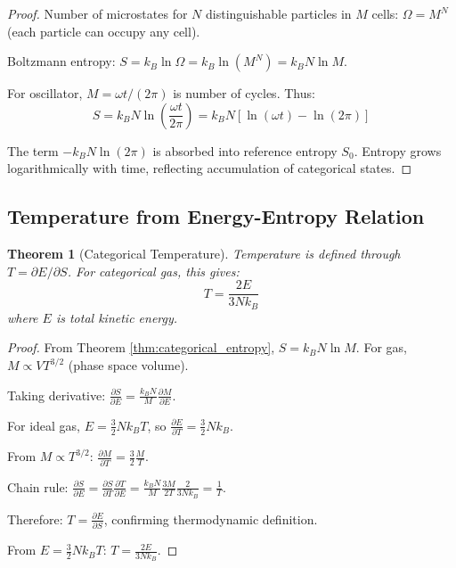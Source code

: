 \documentclass[twocolumn,10pt]{article}
\newtheorem{theorem}{Theorem}[section]
\begin{document}
\begin{proof}
Number of microstates for $N$ distinguishable particles in $M$ cells: $\Omega = M^N$ (each particle can occupy any cell).

Boltzmann entropy: $S = k_B \ln \Omega = k_B \ln(M^N) = k_B N \ln M$.

For oscillator, $M = \omega t/(2\pi)$ is number of cycles. Thus:
\begin{equation}
S = k_B N \ln\left(\frac{\omega t}{2\pi}\right) = k_B N [\ln(\omega t) - \ln(2\pi)]
\end{equation}

The term $-k_B N \ln(2\pi)$ is absorbed into reference entropy $S_0$. Entropy grows logarithmically with time, reflecting accumulation of categorical states.
\end{proof}

\subsection{Temperature from Energy-Entropy Relation}

\begin{theorem}[Categorical Temperature]
\label{thm:categorical_temperature}
Temperature is defined through $T = \partial E/\partial S$. For categorical gas, this gives:
\begin{equation}
T = \frac{2E}{3Nk_B}
\end{equation}
where $E$ is total kinetic energy.
\end{theorem}

\begin{proof}
From Theorem \ref{thm:categorical_entropy}, $S = k_B N \ln M$. For gas, $M \propto V T^{3/2}$ (phase space volume).

Taking derivative: $\frac{\partial S}{\partial E} = \frac{k_B N}{M}\frac{\partial M}{\partial E}$.

For ideal gas, $E = \frac{3}{2}Nk_BT$, so $\frac{\partial E}{\partial T} = \frac{3}{2}Nk_B$.

From $M \propto T^{3/2}$: $\frac{\partial M}{\partial T} = \frac{3}{2}\frac{M}{T}$.

Chain rule: $\frac{\partial S}{\partial E} = \frac{\partial S}{\partial T}\frac{\partial T}{\partial E} = \frac{k_B N}{M} \frac{3M}{2T} \frac{2}{3Nk_B} = \frac{1}{T}$.

Therefore: $T = \frac{\partial E}{\partial S}$, confirming thermodynamic definition.

From $E = \frac{3}{2}Nk_BT$: $T = \frac{2E}{3Nk_B}$.
\end{proof}
\end{document}
